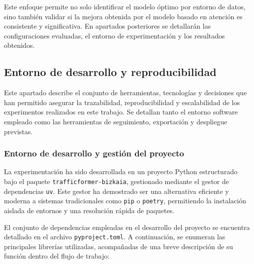 Este enfoque permite no solo identificar el modelo óptimo por entorno de datos, sino también validar si la mejora obtenida por el modelo basado en atención es consistente y significativa. En apartados posteriores se detallarán las configuraciones evaluadas, el entorno de experimentación y los resultados obtenidos.

\subsection{Entorno de desarrollo y reproducibilidad}
\label{sec:entorno_reproducibilidad}

Este apartado describe el conjunto de herramientas, tecnologías y decisiones que han permitido asegurar la trazabilidad, reproducibilidad y escalabilidad de los experimentos realizados en este trabajo. Se detallan tanto el entorno software empleado como las herramientas de seguimiento, exportación y despliegue previstas.

\subsubsection*{Entorno de desarrollo y gestión del proyecto}

La experimentación ha sido desarrollada en un proyecto Python estructurado bajo el paquete \texttt{trafficformer-bizkaia}, gestionado mediante el gestor de dependencias \texttt{uv}. Este gestor ha demostrado ser una alternativa eficiente y moderna a sistemas tradicionales como \texttt{pip} o \texttt{poetry}, permitiendo la instalación aislada de entornos y una resolución rápida de paquetes.

El conjunto de dependencias empleadas en el desarrollo del proyecto se encuentra detallado en el archivo \texttt{pyproject.toml}. A continuación, se enumeran las principales librerías utilizadas, acompañadas de una breve descripción de su función dentro del flujo de trabajo:

